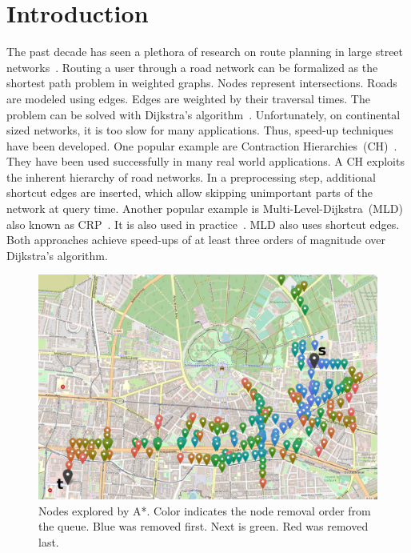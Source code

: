 \documentclass[manuscript,review]{acmart}
\begin{document}

\maketitle

\section{Introduction}
\label{sec:intro}
The past decade has seen a plethora of research on route planning in large street networks~\cite{bdgmpsww-rptn-16}.
Routing a user through a road network can be formalized as the shortest path problem in weighted graphs.
Nodes represent intersections.
Roads are modeled using edges.
Edges are weighted by their traversal times.
The problem can be solved with Dijkstra's algorithm~\cite{d-ntpcg-59}.
Unfortunately, on continental sized networks, it is too slow for many applications.
Thus, speed-up techniques have been developed.
One popular example are Contraction Hierarchies~(CH)~\cite{gssv-erlrn-12}.
They have been used successfully in many real world applications.
A CH exploits the inherent hierarchy of road networks.
In a preprocessing step, additional shortcut edges are inserted, which allow skipping unimportant parts of the network at query time.
Another popular example is Multi-Level-Dijkstra~(MLD)~\cite{swz-umlgt-02} also known as CRP~\cite{dgpw-crprn-13}.
It is also used in practice~\cite{bingblog}.
MLD also uses shortcut edges.
Both approaches achieve speed-ups of at least three orders of magnitude over Dijkstra's algorithm.

\begin{figure}
\centering
\includegraphics[width=.6\columnwidth]{fig/searchspace_st.png}
\caption{Nodes explored by A*. Color indicates the node removal order from the queue. Blue was removed first. Next is green. Red was removed last.}
\label{img:search-space}
\end{figure}
\end{document}
